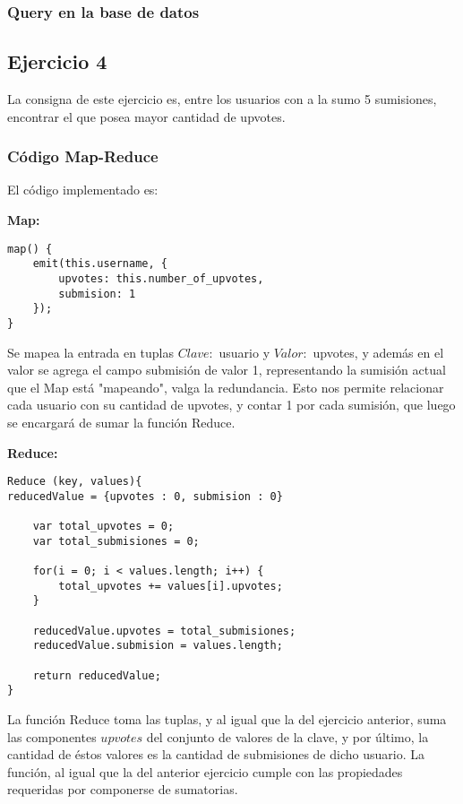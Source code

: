 \subsubsection{Query en la base de datos}


\subsection{Ejercicio 4}

La consigna de este ejercicio es, entre los usuarios con a la sumo 5 sumisiones, encontrar el que posea mayor cantidad de
upvotes.

\subsubsection{C\'odigo Map-Reduce}

El c\'odigo implementado es:

\textbf{Map:}

\begin{lstlisting}
map() {
    emit(this.username, {
    	upvotes: this.number_of_upvotes,
    	submision: 1
    });
}
\end{lstlisting}

Se mapea la entrada en tuplas $Clave:$ usuario y $Valor:$ upvotes, y adem\'as en el valor se agrega el campo submisi\'on de valor 1, representando la sumisi\'on actual que el Map est\'a "mapeando", valga la redundancia. Esto nos permite relacionar cada usuario con su cantidad de upvotes, y contar 1 por cada sumisi\'on, que luego se encargar\'a de sumar la funci\'on Reduce.


\vspace{2mm}

\textbf{Reduce:}

\begin{lstlisting}
Reduce (key, values){
reducedValue = {upvotes : 0, submision : 0}
	
	var total_upvotes = 0;
	var total_submisiones = 0;

	for(i = 0; i < values.length; i++) {
		total_upvotes += values[i].upvotes;
	}

	reducedValue.upvotes = total_submisiones;
	reducedValue.submision = values.length;

    return reducedValue;
}
\end{lstlisting}

\vspace{2mm}

La funci\'on Reduce toma las tuplas, y al igual que la del ejercicio anterior, suma las componentes $upvotes$ del conjunto de valores de la clave, y por \'ultimo, la cantidad de \'estos valores es la cantidad de submisiones de dicho usuario. La funci\'on, al igual que la del anterior ejercicio cumple con las propiedades requeridas por componerse de sumatorias.

